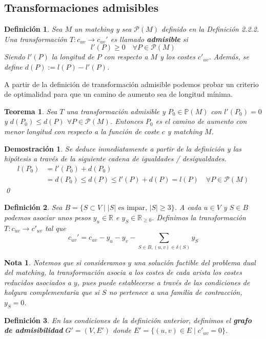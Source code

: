 \documentclass[twoside,a4paper,openright,12pt,tikz]{book}
\newtheorem{defi}{Definici\'on}[section]
\newtheorem{nota}{Nota}[section]
\newtheorem{thm}{Teorema}[section]
\newtheorem*{dem}{Demostración}
\newcommand{\R}{\mathbb{R}}
\begin{document}
\subsection{Transformaciones admisibles}
\begin{defi}
Sea $M$ un matching y sea $\mathcal{P}(M)$ definido en la Definición 2.2.2. Una transformación $T:c_{uv}\to c_{uv}'$ es llamado \textbf{admisible} si
$$
l'(P)\geq 0\quad \forall P \in \mathcal{P}(M)
$$
Siendo $l'(P)$ la longitud de $P$ con respecto a $M$ y los costes $c'_{uv}$. Además, se define $d(P):= l(P)-l'(P)$.
\end{defi}
A partir de la definición de transformación admisible podemos probar un criterio de optimalidad para que un camino de aumento sea de longitud mínima.
\begin{thm}
Sea $T$ una transformación admisible y $P_0 \in \mathbb{P}(M)$ con $l'(P_0) =0$ y 	$d(P_0)\leq d(P)$ $\forall P \in \mathcal{P}(M)$. Entonces $P_0$ es el camino de aumento con menor longitud con respecto a la función de coste $c$ y matching $M$.
\end{thm}
\begin{dem}
Se deduce inmediatamente a partir de la definición y las hipótesis a través de la siguiente cadena de igualdades / desigualdades.
\begin{align*}
l(P_0) &= l'(P_0) + d(P_0)\\
&=d(P_0)\leq d(P) \leq l'(P) + d(P) = l(P)  \quad \forall P \in \mathcal{P}(M)
\end{align*}
\qed
\end{dem}
\begin{defi}
Sea $B=\{S\subset V \mid |S| \text{ es impar, }|S|\geq 3\}$. A cada $u\in V$ y $S\in B$ podemos asociar unos pesos $y_u \in \R$ e $y_S \in \R_{\geq 0}$. Definimos la transformación $T:c_{uv}\to c'_{uv}$ tal que
$$
c_{uv}' =c_{uv}-y_u-y_v - \sum_{S\in B, (u,v)\in \delta(S)}y_S
$$
\end{defi}
\begin{nota}
Notemos que si consideramos $y$ una solución factible del problema dual del matching, la transformación asocia a los costes de cada arista los costes reducidos asociados a $y$, pues puede establecerse a través de las condiciones de holgura complementaria que si $S$ no pertenece a una familia de contracción, $y_S =0$.
\end{nota}
\begin{defi}
En las condiciones de la definición anterior, definimos el \textbf{grafo de admisibilidad} $G' = (V,E')$ donde $E' = \{(u,v)\in E\mid c'_{uv}=0\}$.
\end{defi}
\end{document}
